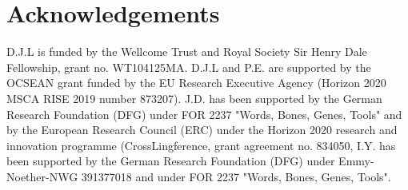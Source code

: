 \documentclass[a4]{article}
\newcommand{\+}[1]{\mathbf{#1}}
\begin{document}





\section{Acknowledgements}

D.J.L is funded by the Wellcome Trust and Royal Society Sir Henry Dale Fellowship, grant no. WT104125MA.
D.J.L and P.E. are supported by the OCSEAN grant funded by the EU Research Executive Agency (Horizon 2020 MSCA RISE 2019 number 873207).
J.D. has been supported by the German Research Foundation (DFG) under FOR 2237 "Words, Bones, Genes, Tools" and by the European Research Council (ERC) under the Horizon 2020 research and innovation programme (CrossLingference, grant agreement no. 834050,
I.Y. has been supported by the German Research Foundation (DFG) under Emmy-Noether-NWG 391377018 and under FOR 2237 "Words, Bones, Genes, Tools".
\end{document}
